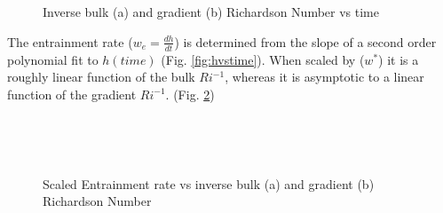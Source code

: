 \begin{figure}[htbp]

\begin{minipage}[b]{0.5\linewidth}
         
        \\
        \end{minipage}             
\quad
\begin{minipage}[b]{0.5\linewidth}
        \\
       
       \end{minipage}
        \caption{Inverse bulk (a)  and gradient (b) Richardson Number vs time}
        \label{fig:invristime}
\end{figure}

The entrainment rate ($w_{e}= \frac{dh}{dt}$) is determined from the slope of a second order polynomial fit to $h(time)$ (Fig. \ref{fig:hvstime}).  When scaled by ($w^{*}$) it is a roughly linear function 
of the bulk $Ri^{-1}$, whereas it is asymptotic to a linear function of the gradient $Ri^{-1}$. (Fig. \ref{fig:scaledweinvri})\\    

\begin{figure}[htbp]
\begin{minipage}[b]{0.5\linewidth}
        \\
        \end{minipage}             
\quad
\begin{minipage}[b]{0.5\linewidth}
        \\
       
       \end{minipage}
        \caption{Scaled Entrainment rate vs inverse bulk (a)  and gradient (b) Richardson Number}
        \label{fig:scaledweinvri}
\end{figure}

